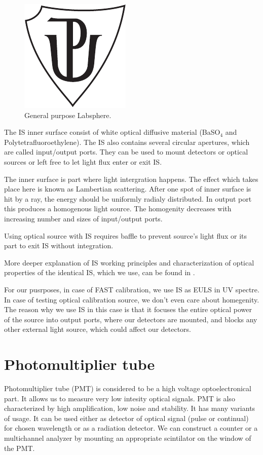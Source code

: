 \begin{figure}[H]
 \centering
 \includegraphics{up_logo_bw}
 \caption{General purpose Labsphere.}
 \label{Labsphere}
 
\end{figure}
\par
The IS inner surface consist of white optical diffusive material (BaSO$_4$ and Polytetrafluoroethylene). The IS also contains several circular apertures, which are called input/output ports. They can be used to mount detectors or optical sources or left free to let light flux enter or exit IS. 
\par
The inner surface is part where light intergration happens. The effect which takes place here is known as Lambertian scattering. After one spot of inner surface is hit by a ray, the energy should be uniformly radialy distributed. In output port this produces a homogenous light source. The homogenity decreases with increasing number and sizes of input/output ports.
\par
Using optical source with IS requires baffle to prevent source's light flux or its part to exit IS without integration.
\par
More deeper explanation of IS working principles and characterization of optical properties of the identical IS, which we use, can be found in \cite{VACULA2021167169}.
\par
For our pusrposes, in case of FAST calibration, we use IS as EULS in UV spectre. In case of testing optical calibration source, we don't even care about homegenity. The reason why we use IS in this case is that it focuses the entire optical power of the source into output ports, where  our detectors are mounted, and blocks any other external light source, which could affect our detectors.

\section{Photomultiplier tube}
Photomultiplier tube (PMT) is considered to be a high voltage optoelectronical part. It allows us to measure very low intesity optical signals. PMT is also characterized by high amplification, low noise and stability. It has many variants of usage. It can be used either as detector of optical signal (pulse or continual) for chosen wavelength or as a radiation detector. We can construct a counter or a multichannel analyzer by mounting an appropriate scintilator on the window of the PMT. 
